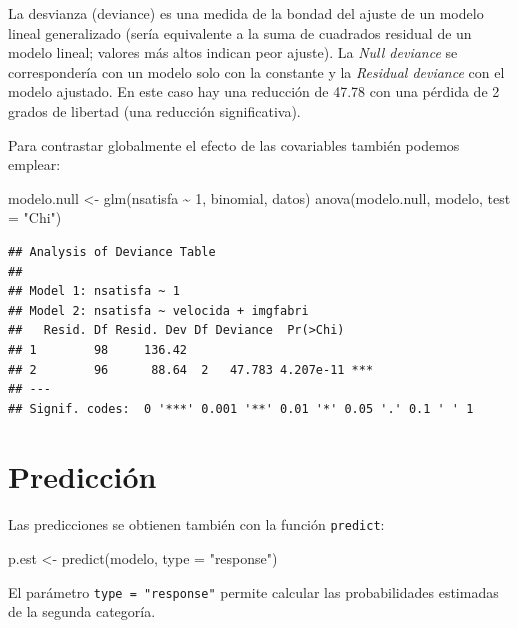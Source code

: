 \documentclass[
]{book}
\newenvironment{Shaded}{\begin{snugshade}}{\end{snugshade}}
\newcommand{\AttributeTok}[1]{\textcolor[rgb]{0.77,0.63,0.00}{#1}}
\newcommand{\DecValTok}[1]{\textcolor[rgb]{0.00,0.00,0.81}{#1}}
\newcommand{\FunctionTok}[1]{\textcolor[rgb]{0.00,0.00,0.00}{#1}}
\newcommand{\NormalTok}[1]{#1}
\newcommand{\OtherTok}[1]{\textcolor[rgb]{0.56,0.35,0.01}{#1}}
\newcommand{\SpecialCharTok}[1]{\textcolor[rgb]{0.00,0.00,0.00}{#1}}
\newcommand{\StringTok}[1]{\textcolor[rgb]{0.31,0.60,0.02}{#1}}
\theoremstyle{break}
\begin{document}
La desvianza (deviance) es una medida de la bondad del ajuste de un modelo lineal generalizado (sería equivalente a la suma de cuadrados residual de un modelo lineal; valores más altos indican peor ajuste). La \emph{Null deviance} se correspondería con un modelo solo con la constante y la \emph{Residual deviance} con el modelo ajustado.
En este caso hay una reducción de 47.78 con una pérdida de 2 grados de libertad (una reducción significativa).

Para contrastar globalmente el efecto de las covariables también podemos emplear:

\begin{Shaded}
\begin{Highlighting}[]
\NormalTok{modelo.null }\OtherTok{\textless{}{-}} \FunctionTok{glm}\NormalTok{(nsatisfa }\SpecialCharTok{\textasciitilde{}} \DecValTok{1}\NormalTok{, binomial, datos)}
\FunctionTok{anova}\NormalTok{(modelo.null, modelo, }\AttributeTok{test =} \StringTok{"Chi"}\NormalTok{)}
\end{Highlighting}
\end{Shaded}

\begin{verbatim}
## Analysis of Deviance Table
## 
## Model 1: nsatisfa ~ 1
## Model 2: nsatisfa ~ velocida + imgfabri
##   Resid. Df Resid. Dev Df Deviance  Pr(>Chi)    
## 1        98     136.42                          
## 2        96      88.64  2   47.783 4.207e-11 ***
## ---
## Signif. codes:  0 '***' 0.001 '**' 0.01 '*' 0.05 '.' 0.1 ' ' 1
\end{verbatim}

\hypertarget{predicciuxf3n-1}{%
\section{Predicción}\label{predicciuxf3n-1}}

Las predicciones se obtienen también con la función \texttt{predict}:

\begin{Shaded}
\begin{Highlighting}[]
\NormalTok{p.est }\OtherTok{\textless{}{-}} \FunctionTok{predict}\NormalTok{(modelo, }\AttributeTok{type =} \StringTok{"response"}\NormalTok{)}
\end{Highlighting}
\end{Shaded}

El parámetro \texttt{type\ =\ "response"} permite calcular las probabilidades estimadas de la segunda categoría.
\end{document}
